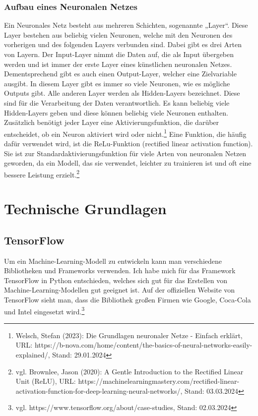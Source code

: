 \documentclass[11pt,oneside]{report}
\begin{document}
\subsection{Aufbau eines Neuronalen Netzes}
Ein Neuronales Netz besteht aus mehreren Schichten, sogenannte „Layer“. Diese Layer bestehen aus beliebig vielen Neuronen, welche mit den Neuronen des vorherigen und des folgenden Layers verbunden sind. Dabei gibt es drei Arten von Layern. Der Input-Layer nimmt die Daten auf, die als Input übergeben werden und ist immer der erste Layer eines künstlichen neuronalen Netzes. Dementsprechend gibt es auch einen Output-Layer, welcher eine Zielvariable ausgibt. In diesem Layer gibt es immer so viele Neuronen, wie es mögliche Outputs gibt. Alle anderen Layer werden als Hidden-Layers bezeichnet. Diese sind für die Verarbeitung der Daten verantwortlich. Es kann beliebig viele Hidden-Layers geben und diese können beliebig viele Neuronen enthalten. Zusätzlich benötigt jeder Layer eine Aktivierungsfunktion, die darüber entscheidet, ob ein Neuron aktiviert wird oder nicht.\footnote{Welsch, Stefan (2023): Die Grundlagen neuronaler Netze - Einfach erklärt, URL: https://b-nova.com/home/content/the-basics-of-neural-networks-easily-explained/, Stand: 29.01.2024} Eine Funktion, die häufig dafür verwendet wird, ist die ReLu-Funktion (rectified linear activation function). Sie ist zur Standardaktivierungsfunktion für viele Arten von neuronalen Netzen geworden, da ein Modell, das sie verwendet, leichter zu trainieren ist und oft eine bessere Leistung erzielt.\footnote{vgl. Brownlee, Jason (2020): A Gentle Introduction to the Rectified Linear Unit (ReLU), URL: https://machinelearningmastery.com/rectified-linear-activation-function-for-deep-learning-neural-networks/, Stand: 03.03.2024}


\chapter{Technische Grundlagen}

\section{TensorFlow}
Um ein Machine-Learning-Modell zu entwickeln kann man verschiedene Bibliotheken und Frameworks verwenden. Ich habe mich für das Framework TensorFlow in Python entschieden, welches sich gut für das Erstellen von Machine-Learning-Modellen gut geeignet ist. Auf der offiziellen Website von TensorFlow sieht man, dass die Bibliothek großen Firmen wie Google, Coca-Cola und Intel eingesetzt wird.\footnote{vgl. https://www.tensorflow.org/about/case-studies, Stand: 02.03.2024}
\end{document}
